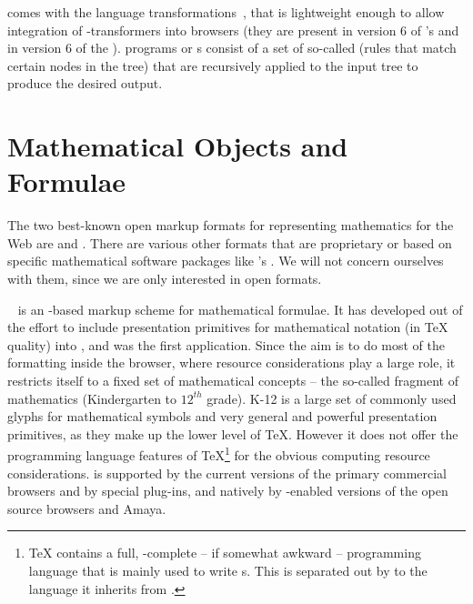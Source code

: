 {\xml} comes with the {\indextoo{{\xslt}}} {} language
transformations~\cite{Deach:exls99}, that is lightweight enough to allow
integration of {\xslt}-transformers into browsers (they are present in version 6
of {}'s {} and in version 6 of the
{} {}).  {\xslt} programs or
{s} consist of a set of so-called {}
(rules that match certain nodes in the {\xml} tree) that are recursively applied
to the input tree to produce the desired output. 

\section{Mathematical Objects and Formulae}\label{sec:math-objects}

The two best-known open markup formats for representing mathematics for the Web
are {\mathml} and {\openmath}. There are various other formats that are
proprietary or based on specific mathematical software packages like
{}'s {\mathematica{}}. We
will not concern ourselves with them, since we are only interested in open
formats.

{}~\cite{CarIon:MathML01} is
an {\xml}-based markup scheme for mathematical formulae. It has
developed out of the effort to include presentation primitives for
mathematical notation (in {\TeX}{} quality) into
{\html}, and was the first {\xml} application.  Since the aim is to do
most of the formatting inside the browser, where resource
considerations play a large role, it restricts itself to a fixed set
of mathematical concepts -- the so-called {} fragment
of mathematics (Kindergarten to $12^{th}$ grade). K-12 is a large set
of commonly used glyphs for mathematical symbols and very general and
powerful presentation primitives, as they make up the lower level of
{\TeX}.  However it does not offer the programming language features
of {\TeX}\footnote{{\TeX} contains a full,
{}-complete -- if somewhat awkward -- programming
language that is mainly used to write {}s.  This
is separated out by {\mathml} to the {\xslt} language it inherits from
{\xml}.} for the obvious computing resource considerations.  {\mathml}
is supported by the current versions of the primary commercial
browsers {\msie} and
{\netscape} by special plug-ins, and
natively by {\mathml}-enabled versions of the open source browsers
{\mozilla} and {\sc
Amaya}.

